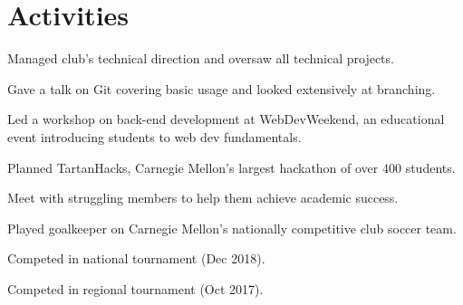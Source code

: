 \documentclass[]{openfont}
\begin{document}
\begin{minipage}[t]{0.60\textwidth}
\sectionsep


\section{Activities} 
\begin{tightemize}
    \item Managed club's technical direction and oversaw all technical projects.
    \item Gave a talk on Git covering basic usage and looked extensively at
        branching.
    \item Led a workshop on back-end development at WebDevWeekend, an
        educational event introducing students to web dev fundamentals.
    \item Planned TartanHacks, Carnegie Mellon's largest hackathon of over 400
        students.
\end{tightemize}

\sectionsep

\begin{tightemize}
    \item Meet with struggling members to help them achieve academic success.
\end{tightemize}

\sectionsep

\begin{tightemize}
    \item Played goalkeeper on Carnegie Mellon's nationally competitive club soccer team.
    \item Competed in national tournament (Dec 2018).
    \item Competed in regional tournament (Oct 2017).
\end{tightemize}

\sectionsep

\end{minipage} 
\end{document}
